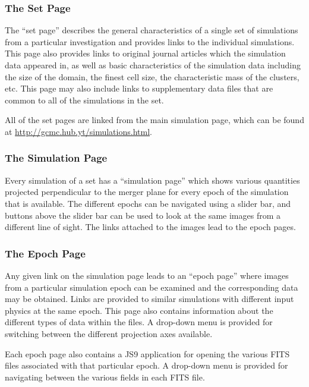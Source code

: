 \documentclass{emulateapj}
\begin{document}
\subsubsection{The Set Page}\label{sec:set_page}

The ``set page'' describes the general characteristics of a single set of simulations from a particular investigation and provides links to the individual simulations. This page also provides links to original journal articles which the simulation data appeared in, as well as basic characteristics of the simulation data including the size of the domain, the finest cell size, the characteristic mass of the clusters, etc. This page may also include links to supplementary data files that are common to all of the simulations in the set.

All of the set pages are linked from the main simulation page, which can be found at \url{http://gcmc.hub.yt/simulations.html}.

\subsubsection{The Simulation Page}\label{sec:sim_page}

Every simulation of a set has a ``simulation page'' which shows various quantities projected perpendicular to the merger plane for every epoch of the simulation that is available. The different epochs can be navigated using a slider bar, and buttons above the slider bar can be used to look at the same images from a different line of sight. The links attached to the images lead to the epoch pages.

\subsubsection{The Epoch Page}\label{sec:epoch_page}

Any given link on the simulation page leads to an ``epoch page'' where images from a particular simulation epoch can be examined and the corresponding data may be obtained. Links are provided to similar simulations with different input physics at the same epoch. This page also contains information about the different types of data within the files. A drop-down menu is provided for switching between the different projection axes available.

Each epoch page also contains a JS9 application for opening the various FITS files associated with that particular epoch. A drop-down menu is provided for navigating between the various fields in each FITS file.
\end{document}
